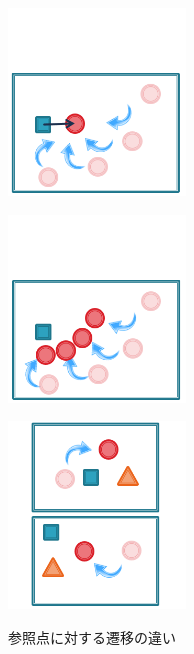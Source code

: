 \begin{figure}[h]
	\centering
	\begin{minipage}[t]{.3\textwidth}
		\centering
		\includegraphics[width=4.7cm]{figure2_sub_a.png} \\ %
		\label{subfigure:difference_displacement1}    
	\end{minipage}
	\begin{minipage}[t]{.3\textwidth}
		\centering
		\includegraphics[width=4.7cm]{figure2_sub_b.png} \\ %
		\label{subfigure:difference_displacement2}
	\end{minipage}
	\begin{minipage}[t]{.3\textwidth}
		\centering
		\includegraphics[width=4.7cm]{figure2_sub_c.png} \\ %
		\label{subfigure:difference_displacement3}
	\end{minipage}
	\caption{参照点に対する遷移の違い}
	\label{figure:difference_displacement}
\end{figure}


